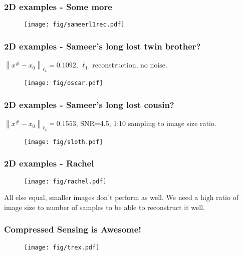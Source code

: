 \documentclass[mathserif,18pt,xcolor=table]{beamer}
\newcommand{\norm}[1]{\left\lVert #1 \right\rVert}
\begin{document}
\iftrue

\begin{frame}[t]
	\frametitle{2D examples - Some more}
\pause
	
\begin{figure}
\centering
\texttt{[image: fig/sameerl1rec.pdf]}
\end{figure}

\end{frame}

\begin{frame}[t]
	\frametitle{2D examples - Sameer's long lost twin brother?}

$\norm{x^\# -x_0}_{\ell_2} = 0.1092$, $\ell_1$ reconstruction, no noise.

\begin{figure}
\centering
\texttt{[image: fig/oscar.pdf]}
\end{figure}


\end{frame}

\begin{frame}[t]
	\frametitle{2D examples - Sameer's long lost cousin?}

$\norm{x^\# -x_0}_{\ell_2} = 0.1553$, SNR=4.5, 1:10 sampling to image size ratio.

\begin{figure}
\centering
\texttt{[image: fig/sloth.pdf]}
\end{figure}


\end{frame}

\fi

\begin{frame}[t]
	\frametitle{2D examples - Rachel}

\begin{figure}
\centering
\texttt{[image: fig/rachel.pdf]}
\end{figure}

All else equal, smaller images don't perform as well. We need a high ratio of image size to number of samples
to be able to reconstruct it well.


\end{frame}

\begin{frame}[t]
	\frametitle{Compressed Sensing is Awesome!}

\begin{figure}
\centering
\texttt{[image: fig/trex.pdf]}
\end{figure}


\end{frame}
\end{document}
